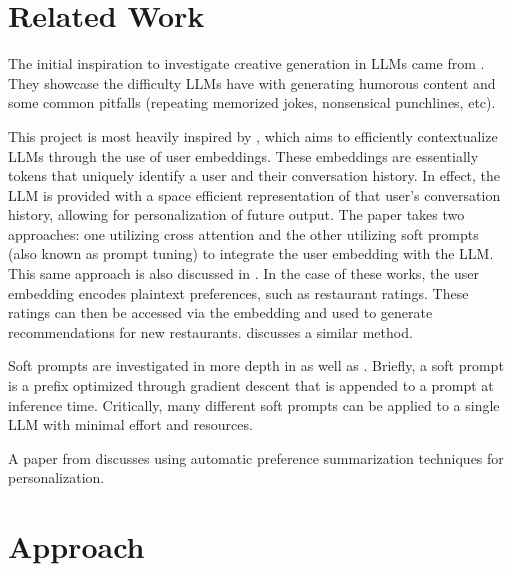 \documentclass[11pt]{article}
\begin{document}

\section{Related Work}

The initial inspiration to investigate creative generation in LLMs came from \citet{jentzsch2023chatgptfunfunnyhumor}. They showcase the difficulty LLMs have with generating humorous content and some common pitfalls (repeating memorized jokes, nonsensical punchlines, etc). 

This project is most heavily inspired by \citet{ning2024userllm}, which aims to efficiently contextualize LLMs through the use of user embeddings. These embeddings are essentially tokens that uniquely identify a user and their conversation history. In effect, the LLM is provided with a space efficient representation of that user's conversation history, allowing for personalization of future output. The paper takes two approaches: one utilizing cross attention and the other utilizing soft prompts (also known as prompt tuning) to integrate the user embedding with the LLM. This same approach is also discussed in \citet{doddapaneni2024userembeddingmodelpersonalized}. In the case of these works, the user embedding encodes plaintext preferences, such as restaurant ratings. These ratings can then be accessed via the embedding and used to generate recommendations for new restaurants. \citet{liu2024llmspersonaplug} discusses a similar method. 

Soft prompts are investigated in more depth in \citet{lester2021powerscaleparameterefficientprompt} as well as \citet{hebert2024persomapersonalizedsoftprompt}. Briefly, a soft prompt is a prefix optimized through gradient descent that is appended to a prompt at inference time. Critically, many different soft prompts can be applied to a single LLM with minimal effort and resources.

A paper from \citet{richardson2023integratingsummarizationretrievalenhanced} discusses using automatic preference summarization techniques for personalization.


\section{Approach}
\end{document}
